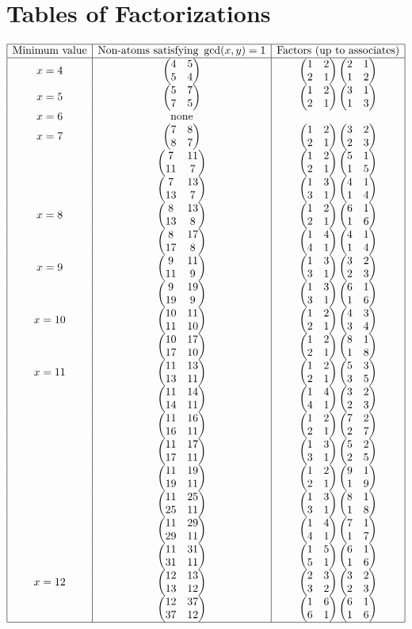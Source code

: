 \documentclass{amsart}
\newcommand{\pmx}[4]{\begin{pmatrix} #1 & #2 \\ #3 & #4 \end{pmatrix}}
\begin{document}


\appendix

\section{Tables of Factorizations}\label{sec:Appendix}

\begin{table}[H]
\caption{Bisymmetric Matrices that Factor and satisfy $\gcd(x,y)=1$}
$\begin{array}{|c|c|c|}
    \hline
    \text{Minimum value}& \text{Non-atoms satisfying }\gcd(x,y)=1& \text{Factors (up to associates)}\\
    \hline
   x=4& \pmx{4}{5}{5}{4} & \pmx{1}{2}{2}{1} \pmx{2}{1}{1}{2}\\
    x=5 &\pmx{5}{7}{7}{5} & \pmx{1}{2}{2}{1} \pmx{3}{1}{1}{3}\\
    x=6 & \text{none} &\\
    x=7 & \pmx{7}{8}{8}{7} & \pmx{1}{2}{2}{1}\pmx{3}{2}{2}{3}\\
        & \pmx{7}{11}{11}{7}& \pmx{1}{2}{2}{1}\pmx{5}{1}{1}{5}\\
        & \pmx{7}{13}{13}{7}& \pmx{1}{3}{3}{1}\pmx{4}{1}{1}{4}\\
    x=8 & \pmx{8}{13}{13}{8} & \pmx{1}{2}{2}{1}\pmx{6}{1}{1}{6}\\
        & \pmx{8}{17}{17}{8}&\pmx{1}{4}{4}{1}\pmx{4}{1}{1}{4}\\
    x=9 & \pmx{9}{11}{11}{9} & \pmx{1}{3}{3}{1}\pmx{3}{2}{2}{3}\\
        & \pmx{9}{19}{19}{9} & \pmx{1}{3}{3}{1}\pmx{6}{1}{1}{6}\\
    x=10& \pmx{10}{11}{11}{10} & \pmx{1}{2}{2}{1}\pmx{4}{3}{3}{4}\\
        &\pmx{10}{17}{17}{10}& \pmx{1}{2}{2}{1} \pmx{8}{1}{1}{8}\\
    x=11& \pmx{11}{13}{13}{11}&\pmx{1}{2}{2}{1}\pmx{5}{3}{3}{5}\\
        & \pmx{11}{14}{14}{11}&\pmx{1}{4}{4}{1}\pmx{3}{2}{2}{3}\\
        & \pmx{11}{16}{16}{11}&\pmx{1}{2}{2}{1}\pmx{7}{2}{2}{7}\\
        &\pmx{11}{17}{17}{11} & \pmx{1}{3}{3}{1}\pmx{5}{2}{2}{5}\\
        &\pmx{11}{19}{19}{11} & \pmx{1}{2}{2}{1}\pmx{9}{1}{1}{9}\\
        &\pmx{11}{25}{25}{11} & \pmx{1}{3}{3}{1}\pmx{8}{1}{1}{8}\\
        & \pmx{11}{29}{29}{11} &\pmx{1}{4}{4}{1}\pmx{7}{1}{1}{7}\\
        & \pmx{11}{31}{31}{11} & \pmx{1}{5}{5}{1}\pmx{6}{1}{1}{6}\\
    x=12& \pmx{12}{13}{13}{12} & \pmx{2}{3}{3}{2}\pmx{3}{2}{2}{3}\\
        & \pmx{12}{37}{37}{12}& \pmx{1}{6}{6}{1} \pmx{6}{1}{1}{6}\\

        \hline
\end{array}$
\label{table: main}
\end{table}
\end{document}
